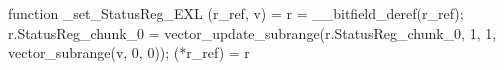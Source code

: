 function _set_StatusReg_EXL (r_ref, v) = {
    r = __bitfield_deref(r_ref);
    r.StatusReg_chunk_0 = vector_update_subrange(r.StatusReg_chunk_0, 1, 1, vector_subrange(v, 0, 0));
    (*r_ref) = r
}

